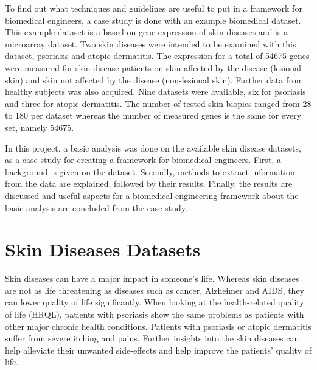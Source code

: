 \documentclass[10pt,a4paper]{report}
\begin{document}
	To find out what techniques and guidelines are useful to put in a framework for biomedical engineers, a case study is done with an example biomedical dataset. This example dataset is a based on gene expression of skin diseases\cite{nair2009genome, suarez2012expanding, bigler2013cross, kim2016spectrum, yao2008type, suarez2011nonlesional, tintle2011reversal, gittler2012progressive} and is a microarray dataset. Two skin diseases were intended to be examined with this dataset, psoriasis and atopic dermatitis. The expression for a total of 54675 genes were measured for skin disease patients on skin affected by the disease (lesional skin) and skin not affected by the disease (non-lesional skin). Further data from healthy subjects was also acquired. Nine datasets were available, six for psoriasis\cite{nair2009genome, suarez2012expanding, bigler2013cross, kim2016spectrum, yao2008type} and three for atopic dermatitis\cite{suarez2011nonlesional, tintle2011reversal, gittler2012progressive}. The number of tested skin biopies ranged from 28 to 180 per dataset whereas the number of measured genes is the same for every set, namely 54675.
	
	In this project, a basic analysis was done on the available skin disease datasets, as a case study for creating a framework for biomedical engineers. First, a background is given on the dataset. Secondly, methods to extract information from the data are explained, followed by their results. Finally, the results are discussed and useful aspects for a biomedical engineering framework about the basic analysis are concluded from the case study.
	
	
	\section{Skin Diseases Datasets}
	\label{sec:SkinDiseasesDataSet}
	
	Skin diseases can have a major impact in someone's life. Whereas skin diseases are not as life threatening as diseases such as cancer, Alzheimer and AIDS, they can lower quality of life significantly. When looking at the health-related quality of life (HRQL), patients with psoriasis show the same problems as patients with other major chronic health conditions\cite{rapp1999psoriasis}. Patients with psoriasis or atopic dermatitis suffer from severe itching and pains. Further insights into the skin diseases can help alleviate their unwanted side-effects and help improve the patients' quality of life\cite{jowett1985skin}.
	
\end{document}
